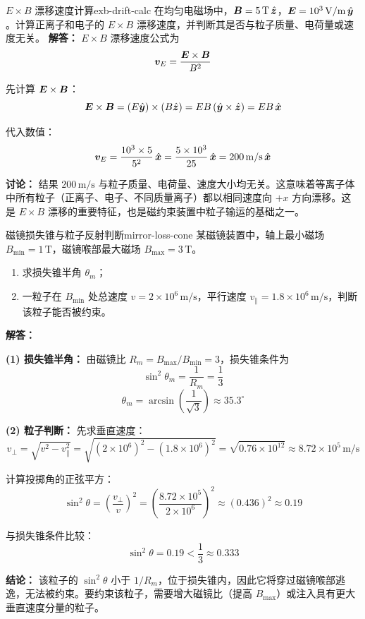 \begin{example}{$E\times B$ 漂移速度计算}{exb-drift-calc}
在均匀电磁场中，$\bm{B}=5\,\mathrm{T}\,\hat{\bm{z}}$，$\bm{E}=10^3\,\mathrm{V/m}\,\hat{\bm{y}}$。计算正离子和电子的 $E\times B$ 漂移速度，并判断其是否与粒子质量、电荷量或速度无关。
\tcblower
\textbf{解答：}
$E\times B$ 漂移速度公式为
\[
\bm{v}_E = \frac{\bm{E}\times\bm{B}}{B^2}
\]

先计算 $\bm{E}\times\bm{B}$：
\[
\bm{E}\times\bm{B} = (E\hat{\bm{y}})\times(B\hat{\bm{z}}) = EB\,(\hat{\bm{y}}\times\hat{\bm{z}}) = EB\,\hat{\bm{x}}
\]

代入数值：
\[
\bm{v}_E = \frac{10^3\times 5}{5^2}\,\hat{\bm{x}} = \frac{5\times 10^3}{25}\,\hat{\bm{x}} = 200\,\mathrm{m/s}\,\hat{\bm{x}}
\]

\textbf{讨论：} 结果 $200\,\mathrm{m/s}$ 与粒子质量、电荷量、速度大小均无关。这意味着等离子体中所有粒子（正离子、电子、不同质量离子）都以相同速度向 $+x$ 方向漂移。这是 $E\times B$ 漂移的重要特征，也是磁约束装置中粒子输运的基础之一。
\end{example}

\begin{example}{磁镜损失锥与粒子反射判断}{mirror-loss-cone}
某磁镜装置中，轴上最小磁场 $B_{\min}=1\,\mathrm{T}$，磁镜喉部最大磁场 $B_{\max}=3\,\mathrm{T}$。
\begin{enumerate}[label=(\arabic*)]
\item 求损失锥半角 $\theta_m$；
\item 一粒子在 $B_{\min}$ 处总速度 $v=2\times 10^6\,\mathrm{m/s}$，平行速度 $v_{\parallel}=1.8\times 10^6\,\mathrm{m/s}$，判断该粒子能否被约束。
\end{enumerate}
\tcblower
\textbf{解答：}

\textbf{(1) 损失锥半角：}
由磁镜比 $R_m = B_{\max}/B_{\min}=3$，损失锥条件为
\[
\sin^2\theta_m = \frac{1}{R_m} = \frac{1}{3}
\]
\[
\theta_m = \arcsin\!\left(\frac{1}{\sqrt{3}}\right) \approx 35.3^{\circ}
\]

\textbf{(2) 粒子判断：}
先求垂直速度：
\[
v_{\perp} = \sqrt{v^2 - v_{\parallel}^2} = \sqrt{(2\times 10^6)^2 - (1.8\times 10^6)^2} = \sqrt{0.76\times 10^{12}} \approx 8.72\times 10^{5}\,\mathrm{m/s}
\]

计算投掷角的正弦平方：
\[
\sin^2\theta = \left(\frac{v_{\perp}}{v}\right)^2 = \left(\frac{8.72\times 10^5}{2\times 10^6}\right)^2 \approx (0.436)^2 \approx 0.19
\]

与损失锥条件比较：
\[
\sin^2\theta = 0.19 < \frac{1}{3} \approx 0.333
\]

\textbf{结论：} 该粒子的 $\sin^2\theta$ 小于 $1/R_m$，位于损失锥内，因此它将穿过磁镜喉部逃逸，无法被约束。要约束该粒子，需要增大磁镜比（提高 $B_{\max}$）或注入具有更大垂直速度分量的粒子。
\end{example}


